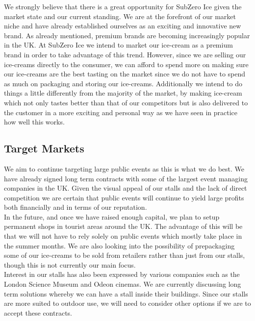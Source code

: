 \documentclass{article}
\begin{document}
  We strongly believe that there is a great opportunity for SubZero Ice given the market state and our current standing. We are at the forefront of our market niche and have already established ourselves as an exciting and innovative new brand. As already mentioned, premium brands are becoming increasingly popular in the UK. At SubZero Ice we intend to market our ice-cream as a premium brand in order to take advantage of this trend. However, since we are selling our ice-creams directly to the consumer, we can afford to spend more on making sure our ice-creams are the best tasting on the market since we do not have to spend as much on packaging and storing our ice-creams. Additionally we intend to do things a little differently from the majority of the market, by making ice-cream which not only tastes better than that of our competitors but is also delivered to the customer in a more exciting and personal way as we have seen in practice how well this works.


  \subsection{Target Markets}

  We aim to continue targeting large public events as this is what we do best. We have already signed long term contracts with some of the largest event managing companies in the UK. Given the visual appeal of our stalls and the lack of direct competition we are certain that public events will continue to yield large profits both financially and in terms of our reputation. \\

  In the future, and once we have raised enough capital, we plan to setup permanent shops in tourist areas around the UK. The advantage of this will be that we will not have to rely solely on public events which mostly take place in the summer months. We are also looking into the possibility of prepackaging some of our ice-creams to be sold from retailers rather than just from our stalls, though this is not currently our main focus. \\

  Interest in our stalls has also been expressed by various companies such as the London Science Museum and Odeon cinemas. We are currently discussing long term solutions whereby we can have a stall inside their buildings. Since our stalls are more suited to outdoor use, we will need to consider other options if we are to accept these contracts.
\end{document}
